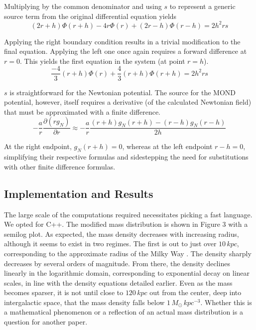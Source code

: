 \documentclass[11pt, twocolumn]{article}
\begin{document}
    Multiplying by the common denominator and using $s$ to represent a generic source term from the original differential equation yields
    \begin{equation} (2r + h)\Phi(r + h) - 4r\Phi (r) + (2r - h)\Phi (r - h) = 2h^2rs \end{equation}

    Applying the right boundary condition results in a trivial modification to the final equation. Applying the left one once again requires a forward difference at $r = 0$. This yields the first equation in the system (at point $r = h$).
    \begin{equation} \frac{-4}{3}(r + h)\Phi (r) + \frac{4}{3}(r + h)\Phi (r + h) = 2h^2rs \end{equation}

    $s$ is straightforward for the Newtonian potential. The source for the MOND potential, however, itself requires a derivative (of the calculated Newtonian field) that must be approximated with a finite difference.
    \begin{equation} -\frac{a}{r}\frac{\partial (rg_N)}{\partial r} \approx -\frac{a}{r}\frac{(r+h)g_N(r + h) - (r - h)g_N(r - h)}{2h} \end{equation}

    At the right endpoint, $g_N(r + h) = 0$, whereas at the left endpoint $r - h = 0$, simplifying their respective formulas and sidestepping the need for substitutions with other finite difference formulas. 

    \subsection*{Implementation and Results}
    The large scale of the computations required necessitates picking a fast language. We opted for C++. The modified mass distribution is shown in Figure 3 with a semilog plot. As expected, the mass density decreases with increasing radius, although it seems to exist in two regimes. The first is out to just over $10 \, \si{kpc}$, corresponding to the approximate radius of the Milky Way \parencite{goodwin_relative_1998}. The density sharply decreases by several orders of magnitude. From there, the density declines linearly in the logarithmic domain, corresponding to exponential decay on linear scales, in line with the density equations detailed earlier. Even as the mass becomes sparser, it is not until close to $120 \, \si{kpc}$ out from the center, deep into intergalactic space, that the mass density falls below $1 \, \si{M_\odot \,kpc^{-3}}$. Whether this is a mathematical phenomenon or a reflection of an actual mass distribution is a question for another paper.
\end{document}
